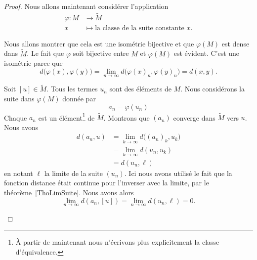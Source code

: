 \begin{proof}
	Nous allons maintenant considérer l'application
	\begin{equation}
		\begin{aligned}
			\varphi\colon M & \to \tilde M                                              \\
			x               & \mapsto \text{la classe de la suite constante } x\text{.}
		\end{aligned}
	\end{equation}
	\begin{subproof}
		Nous allons montrer que cela est une isométrie bijective et que \( \varphi(M)\) est dense dans \( \tilde M\). Le fait que \( \varphi\) soit bijective entre \( M\) et \( \varphi(M)\) est évident. C'est une isométrie parce que
		\begin{equation}
			d\big( \varphi(x),\varphi(y) \big)=\lim_{n\to \infty} d\big(\varphi(x)_n,\varphi(y)_n\big)=d(x,y).
		\end{equation}

		\spitem[Densité]

		Soit \( [u]\in \tilde M\). Tous les termes \( u_n\) sont des éléments de \( M\). Nous considérons la suite dans \( \varphi(M)\) donnée par
		\begin{equation}
			a_n=\varphi(u_n)
		\end{equation}
		Chaque \( a_n\) est un élément\footnote{À partir de maintenant nous n'écrivons plus explicitement la classe d'équivalence.} de \( \tilde M\). Montrons que \( (a_n)\) converge dans \( \tilde M\) vers \( u\). Nous avons
		\begin{subequations}
			\begin{align}
				d(a_n,u) & =\lim_{k\to \infty} d\big( (a_n)_k,u_k \big) \\
				         & =\lim_{k\to \infty} d(u_n,u_k)               \\
				         & =d(u_n,\ell)
			\end{align}
		\end{subequations}
		en notant \( \ell\) la limite de la suite \( (u_n)\). Ici nous avons utilisé le fait que la fonction distance était continue pour l'inverser avec la limite, par le théorème~\ref{ThoLimSuite}. Nous avons alors
		\begin{equation}
			\lim_{n\to \infty} d(a_n,[u])=\lim_{n\to \infty} d(u_n,\ell)=0.
		\end{equation}


\end{subproof}
\end{proof}
